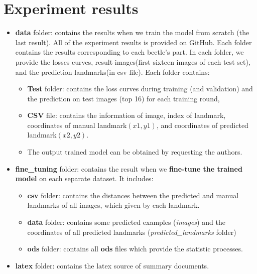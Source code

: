 \documentclass[12pt,a4paper]{article}
\begin{document}
\section*{Experiment results}
\label{apb}
\begin{itemize}
	\item \textbf{data} folder: contains the results when we train the model from scratch (the last result). All of the experiment results is provided on GitHub. Each folder contains the results corresponding to each beetle's part. In each folder, we provide the losses curves, result images(first sixteen images of each test set), and the prediction landmarks(in csv file). Each folder contains:
\begin{itemize}
	\item \textbf{Test} folder: contains the loss curves during training (and validation) and the prediction on test images (top 16) for each training round,
	\item \textbf{CSV} file: contains the information of image, index of landmark, coordinates of manual landmark$(x1,y1)$, and coordinates of predicted landmark$(x2,y2)$.
	\item The output trained model can be obtained by requesting the authors.
\end{itemize}
	\item \textbf{fine\_tuning} folder: contains the result when we \textbf{fine-tune the trained model} on each separate dataset. It includes:
		\begin{itemize}
			\item \textbf{csv} folder: contains the distances between the predicted and manual landmarks of all images, which given by each landmark.
			\item \textbf{data} folder: contains some predicted examples (\textit{images}) and the coordinates of all predicted landmarks (\textit{predicted\_landmarks} folder)
			\item \textbf{ods} folder: contains all \textbf{ods} files which provide the statistic processes.
		\end{itemize}
	\item \textbf{latex} folder: contains the latex source of summary documents.
\end{itemize}
\end{document}
